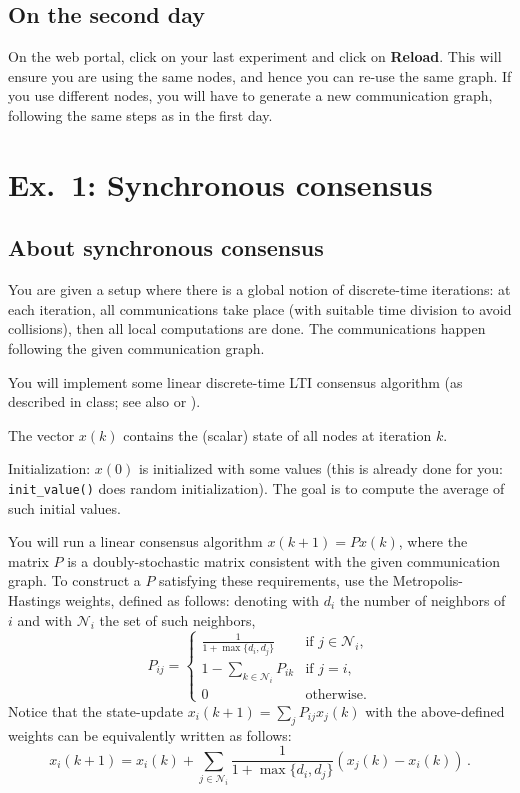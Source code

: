 \documentclass[oneside]{article}
\newcommand{\mc}{\mathcal}
\begin{document}
\subsection{On the second day}
On the web portal, click on your last
experiment and click on \textbf{Reload}. This will ensure you are using the
same nodes, and hence you can re-use the same graph. If you use different nodes, you will have to generate a new communication graph, following the same steps as in the first day.




\section{Ex.~1: Synchronous consensus}

\subsection{About synchronous consensus}

You are given a setup where there is a global notion of discrete-time iterations:
at each iteration, all communications take place (with suitable time division to avoid collisions), then all local computations are done. The communications happen following the given communication graph.

You will implement some linear discrete-time LTI consensus algorithm (as described in class; see also \cite[Chapter~5]{bullo-book} or \cite{consensus-tutorial}).

The vector $x(k)$ contains the (scalar) state of all nodes at iteration $k$.

Initialization: $x(0)$ is initialized with some values (this is already done for you: \verb=init_value()= does random initialization). The goal is to compute the average of such initial values. 

You will run a linear consensus algorithm $x(k+1) = P x(k)$, where the matrix $P$ is a doubly-stochastic matrix consistent with the given communication graph. To construct a $P$ satisfying these requirements, use the Metropolis-Hastings weights, defined as follows:
denoting with $d_i$ the number of neighbors of $i$ and with $\mc N_i$ the set of such neighbors,
\[ P_{ij} =
\begin{cases}
\frac{1}{1+\max\{d_i, d_j \}} & \text{if $j \in \mc N_i$,}\\
1-\sum_{k \in \mc N_i} P_{ik} & \text{if $j = i$,}\\
0							  & \text{otherwise}.
\end{cases}
\]
Notice that the state-update $x_i(k+1) = \sum_j P_{ij} x_j(k)$ with the above-defined weights can be equivalently written as follows:
\[ x_i(k+1) = x_i(k) + \sum_{j \in \mc N_i} \frac{1}{1+\max\{d_i, d_j \}} (x_j(k) - x_i(k)) \,.\]
\end{document}
